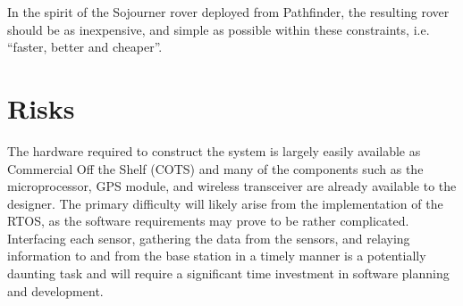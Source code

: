 \documentclass[dvips,12pt]{article}
\begin{document}
In the spirit of the Sojourner rover deployed from Pathfinder, the resulting rover should be as inexpensive, and simple as possible within these constraints, i.e. ``faster, better and cheaper''.

\section{Risks}

The hardware required to construct the system is largely easily available as Commercial Off the Shelf (COTS) and many of the components such as the microprocessor, GPS module, and wireless transceiver are already available to the designer.  The primary difficulty will likely arise from the implementation of the RTOS, as the software requirements may prove to be rather complicated.  Interfacing each sensor, gathering the data from the sensors, and relaying information to and from the base station in a timely manner is a potentially daunting task and will require a significant time investment in software planning and development.
\end{document}
